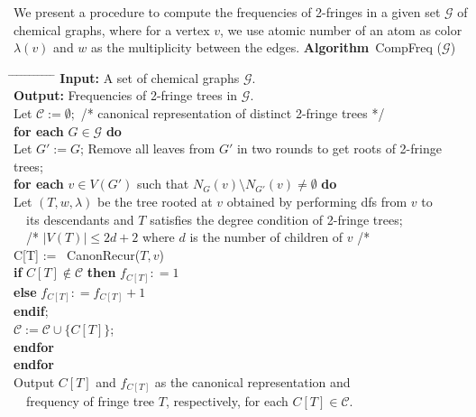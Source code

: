 \documentclass[12pt]{article}
\newcommand{\G}{\mathcal{G}}
\newcommand{\1}{\pmb{1}}
\newcommand{\0}{\pmb{0}}
\begin{document}
We present a procedure to compute the frequencies of 2-fringes in 
a given set $\mathcal{G}$ of chemical graphs, where 
for a vertex $v$, we use atomic number of an atom as color 
$\lambda(v)$ and 
$w$ as the multiplicity between the edges. \newpage
\noindent 
{\bf Algorithm}{~\sc CompFreq ($\mathcal{G}$)}
\begin{tabbing}
%
\hspace{3mm} \= \hspace{3mm} \= \hspace{3mm} \= \hspace{3mm} \= %
\hspace{3mm} \= \hspace{3mm} \= \hspace{3mm} \= \hspace{3mm} \= %
\hspace{3mm} \= \hspace{3mm} \= \hspace{3mm} \= \hspace{3mm}  \kill
{\bf Input: } A set of chemical graphs $\mathcal{G}$.\\
{\bf Output: } Frequencies of 2-fringe trees in $\mathcal{G}$.\\
Let $\mathcal{C}:= \emptyset;$ 
/* canonical representation of distinct 2-fringe trees */\\
%
{\bf for each} $G \in \mathcal{G}$ {\bf do}\+\\
	Let $G' := G$; Remove all leaves from $G'$ in two rounds to get roots of 2-fringe trees;\\
	{\bf for each} $v\in V(G')$ such that 
	     $N_G(v) \setminus N_{G'}(v) \neq \emptyset$ {\bf do}\+ \\
	      Let $(T, w, \lambda)$ be the tree rooted at $v$
	      obtained by performing dfs 
	      from $v$ to \\
	      ~~its descendants and $T$ 
	      satisfies the degree condition of
	      2-fringe trees; \\
	      ~~/* $|V(T)| \leq 2d +2$ where $d$ is the
	      number of children of $v$ /*\\
			C[T] := {~\sc CanonRecur($T, v$)}\\
			{\bf if} $C[T] \not\in \mathcal{C}$ {\bf then} 
					${f_{C[T]} : = 1}$\\
			{\bf else} $f_{C[T]} : = f_{C[T]} + 1$ \\
			{\bf endif};\\
			 $\mathcal{C} := \mathcal{C} \cup \{C[T]\}$; \- \\
	{\bf endfor}\- \\ %
{\bf endfor}\\ %
Output $C[T]$ and  $f_{C[T]}$ as the canonical representation and\\
~~frequency of fringe tree $T$, respectively, for each 
$C[T] \in \mathcal{C}$.
\end{tabbing}\bigskip
\end{document}
